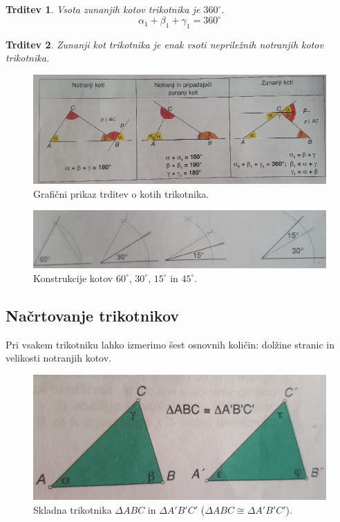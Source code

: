 \documentclass{article}
\newtheorem{trditev}{Trditev}[subsection]
\begin{document}
\begin{trditev}
    Vsota zunanjih kotov trikotnika je $360^\circ$.
    \[
        \alpha_1 + \beta_1 + \gamma_1 = 360^\circ
    \]
\end{trditev}

\begin{trditev}
    Zunanji kot trikotnika je enak vsoti nepriležnih notranjih kotov trikotnika.
\end{trditev}

\begin{figure}[h]
    \includegraphics[width=\textwidth]{trditveOKotihTrikotnika.png}
    \centering
    \caption{Grafični prikaz trditev o kotih trikotnika.}
\end{figure}
\begin{figure}[h]
    \includegraphics[width=\textwidth]{konstrukcijaKotov.png}
    \centering
    \caption{Konstrukcije kotov $60^\circ$, $30^\circ$, $15^\circ$ in $45^\circ$.}
\end{figure}

\pagebreak
\subsection{ Načrtovanje trikotnikov }

Pri vsakem trikotniku lahko izmerimo šest osnovnih količin: dolžine stranic in velikosti notranjih kotov.

\begin{figure}[h]
    \includegraphics[width=0.8\linewidth]{skladnaTrikotnika.png}
    \centering
    \caption{Skladna trikotnika $\Delta ABC$ in $\Delta A'B'C'$ ($\Delta ABC \cong \Delta A'B'C'$).}
\end{figure}
\end{document}
